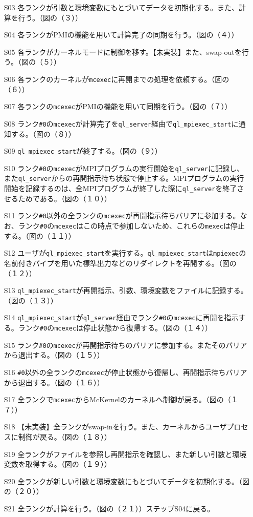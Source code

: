 \documentclass[twoside,11pt,fleqn]{book}
\begin{document}
{\begin{itemize}
\item[S03] 各ランクが引数と環境変数にもとづいてデータを初期化する。また、計算を行う。（図の（３））
\item[S04] 各ランクがPMIの機能を用いて計算完了の同期を行う。（図の（４））
\item[S05] 各ランクがカーネルモードに制御を移す。【未実装】また、swap-outを行う。（図の（５））
\item[S06] 各ランクのカーネルが\texttt{mcexec}に再開までの処理を依頼する。（図の（６））
\item[S07] 各ランクの\texttt{mcexec}がPMIの機能を用いて同期を行う。（図の（７））
\item[S08] ランク\texttt{\#0}の\texttt{mcexec}が計算完了を\texttt{ql\_server}経由で\texttt{ql\_mpiexec\_start}に通知する。（図の（８））
\item[S09] \texttt{ql\_mpiexec\_start}が終了する。（図の（９））
\item[S10] ランク\texttt{\#0}の\texttt{mcexec}がMPIプログラムの実行開始を\texttt{ql\_server}に記録し、また\texttt{ql\_server}からの再開指示待ち状態で停止する。MPIプログラムの実行開始を記録するのは、全MPIプログラムが終了した際に\texttt{ql\_server}を終了させるためである。（図の（１０））
\item[S11] ランク\texttt{\#0}以外の全ランクの\texttt{mcexec}が再開指示待ちバリアに参加する。なお、ランク\texttt{\#0}の\texttt{mcexec}はこの時点で参加しないため、これらの\texttt{mexec}は停止する。（図の（１１））
\item[S12] ユーザが\texttt{ql\_mpiexec\_start}を実行する。\texttt{ql\_mpiexec\_start}は\texttt{mpiexec}の名前付きパイプを用いた標準出力などのリダイレクトを再開する。（図の（１２））
\item[S13] \texttt{ql\_mpiexec\_start}が再開指示、引数、環境変数をファイルに記録する。（図の（１３））
\item[S14] \texttt{ql\_mpiexec\_start}が\texttt{ql\_server}経由でランク\texttt{\#0}の\texttt{mcexec}に再開を指示する。ランク\texttt{\#0}の\texttt{mcexec}は停止状態から復帰する。（図の（１４））
\item[S15] ランク\texttt{\#0}の\texttt{mcexec}が再開指示待ちのバリアに参加する。またそのバリアから退出する。（図の（１５））
\item[S16] \texttt{\#0}以外の全ランクの\texttt{mcexec}が停止状態から復帰し、再開指示待ちバリアから退出する。（図の（１６））
\item[S17] 全ランクで\texttt{mcexec}からMcKernelのカーネルへ制御が戻る。（図の（１７））
\item[S18] 【未実装】全ランクがswap-inを行う。また、カーネルからユーザプロセスに制御が戻る。（図の（１８））
\item[S19] 全ランクがファイルを参照し再開指示を確認し、また新しい引数と環境変数を取得する。（図の（１９））
\item[S20] 全ランクが新しい引数と環境変数にもとづいてデータを初期化する。（図の（２０））
\item[S21] 全ランクが計算を行う。（図の（２１））ステップS04に戻る。
\end{itemize}

}
\end{document}
